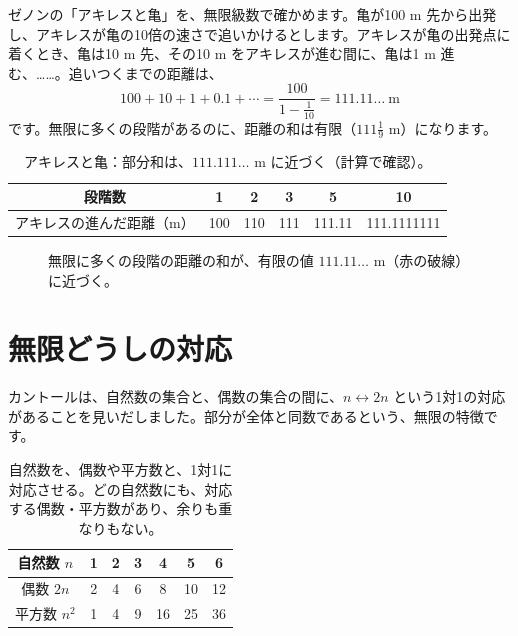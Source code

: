 \documentclass[a4paper,11pt,openany]{ltjsbook}
\begin{document}
ゼノンの「アキレスと亀」を、無限級数で確かめます。亀が100 m 先から出発し、アキレスが亀の10倍の速さで追いかけるとします。アキレスが亀の出発点に着くとき、亀は10 m 先、その10 m をアキレスが進む間に、亀は1 m 進む、……。追いつくまでの距離は、
\[
100+10+1+0.1+\cdots=\frac{100}{1-\tfrac1{10}}=111.11\ldots\ \text{m}
\]
です。無限に多くの段階があるのに、距離の和は有限（$111\tfrac19$ m）になります。

\begin{table}[htbp]
\centering
\begin{tabular}{c|ccccc}
\toprule
段階数 & 1 & 2 & 3 & 5 & 10\\
\midrule
アキレスの進んだ距離（m） & 100 & 110 & 111 & 111.11 & 111.1111111\\
\bottomrule
\end{tabular}
\caption{アキレスと亀：部分和は、$111.111\ldots$ m に近づく（計算で確認）。}
\end{table}

\begin{figure}[htbp]
\centering
{}
\caption{無限に多くの段階の距離の和が、有限の値 $111.11\ldots$ m（赤の破線）に近づく。}
\end{figure}

\section{無限どうしの対応}

カントールは、自然数の集合と、偶数の集合の間に、$n\leftrightarrow2n$ という1対1の対応があることを見いだしました。部分が全体と同数であるという、無限の特徴です。

\begin{table}[htbp]
\centering
\begin{tabular}{c|cccccc}
\toprule
自然数 $n$ & 1 & 2 & 3 & 4 & 5 & 6\\
\midrule
偶数 $2n$ & 2 & 4 & 6 & 8 & 10 & 12\\
平方数 $n^2$ & 1 & 4 & 9 & 16 & 25 & 36\\
\bottomrule
\end{tabular}
\caption{自然数を、偶数や平方数と、1対1に対応させる。どの自然数にも、対応する偶数・平方数があり、余りも重なりもない。}
\end{table}
\end{document}
